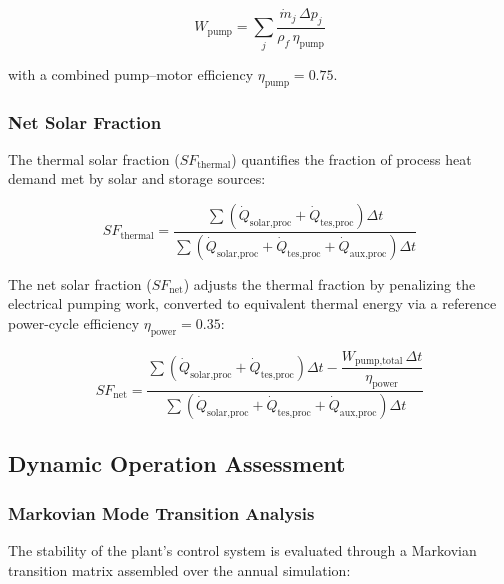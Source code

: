 \documentclass[11pt,review,3p]{elsarticle}
\begin{document}
\begin{equation}
    W_{\text{pump}} = \sum_{j} \frac{\dot{m}_j\,\Delta p_j}{\rho_f\,\eta_{\text{pump}}}
    \label{eq:pump_power}
\end{equation}

with a combined pump--motor efficiency $\eta_{\text{pump}} = 0.75$.

\subsubsection{Net Solar Fraction}
\label{sec:net_sf}

The thermal solar fraction ($SF_{\text{thermal}}$) quantifies the fraction of process heat demand met by solar and storage sources:

\begin{equation}
    SF_{\text{thermal}} = \frac{\sum\left( \dot{Q}_{\text{solar,proc}} + \dot{Q}_{\text{tes,proc}} \right) \Delta t}
                              {\sum\left( \dot{Q}_{\text{solar,proc}} + \dot{Q}_{\text{tes,proc}} + \dot{Q}_{\text{aux,proc}} \right) \Delta t}
    \label{eq:sf_thermal}
\end{equation}

The net solar fraction ($SF_{\text{net}}$) adjusts the thermal fraction by penalizing the electrical pumping work, converted to equivalent thermal energy via a reference power-cycle efficiency $\eta_{\text{power}} = 0.35$:

\begin{equation}
    SF_{\text{net}} = \frac{\sum\left( \dot{Q}_{\text{solar,proc}} + \dot{Q}_{\text{tes,proc}} \right) \Delta t - \dfrac{W_{\text{pump,total}}\,\Delta t}{\eta_{\text{power}}}}
                         {\sum\left( \dot{Q}_{\text{solar,proc}} + \dot{Q}_{\text{tes,proc}} + \dot{Q}_{\text{aux,proc}} \right) \Delta t}
    \label{eq:sf_net}
\end{equation}

\subsection{Dynamic Operation Assessment}
\label{sec:dynamic}

\subsubsection{Markovian Mode Transition Analysis}
\label{sec:markov}

The stability of the plant's control system is evaluated through a Markovian transition matrix assembled over the annual simulation:
\end{document}
